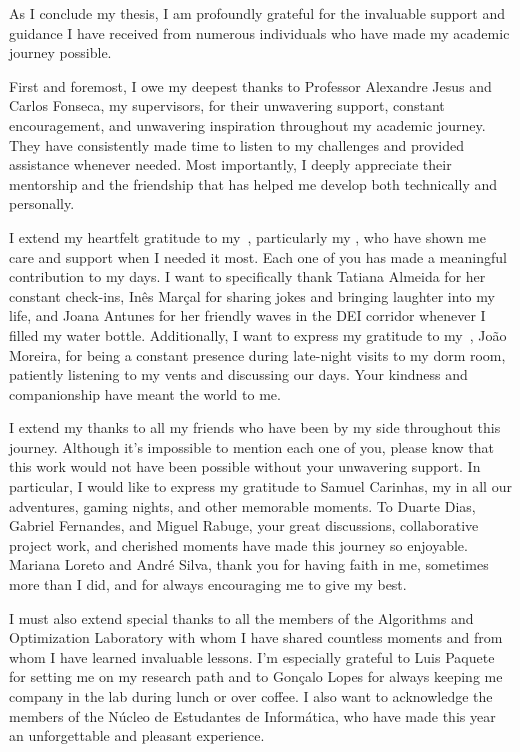 \begin{acknowledgments}

  As I conclude my thesis, I am profoundly grateful for the invaluable support and
  guidance I have received from numerous individuals who have made my academic
  journey possible.

  First and foremost, I owe my deepest thanks to Professor Alexandre Jesus and
  Carlos Fonseca, my supervisors, for their unwavering support, constant
  encouragement, and unwavering inspiration throughout my academic journey. They
  have consistently made time to listen to my challenges and provided assistance
  whenever needed. Most importantly, I deeply appreciate their mentorship and the
  friendship that has helped me develop both technically and personally.

  I extend my heartfelt gratitude to my~, particularly my
  , who have shown me care and support when I needed it most. Each
  one of you has made a meaningful contribution to my days. I want to specifically
  thank Tatiana Almeida for her constant check-ins, Inês Marçal for sharing jokes
  and bringing laughter into my life, and Joana Antunes for her friendly waves in
  the DEI corridor whenever I filled my water bottle. Additionally, I want to
  express my gratitude to my~, João Moreira, for being a constant presence
  during late-night visits to my dorm room, patiently listening to my vents and
  discussing our days. Your kindness and companionship have meant the world to me.

  I extend my thanks to all my friends who have been by my side throughout this
  journey. Although it's impossible to mention each one of you, please know that
  this work would not have been possible without your unwavering support. In
  particular, I would like to express my gratitude to Samuel Carinhas, my
   in all our adventures, gaming nights, and other memorable moments. To Duarte
  Dias, Gabriel Fernandes, and Miguel Rabuge, your great discussions,
  collaborative project work, and cherished moments have made this journey so
  enjoyable. Mariana Loreto and André Silva, thank you for having faith in me,
  sometimes more than I did, and for always encouraging me to give my best.

  I must also extend special thanks to all the members of the Algorithms and
  Optimization Laboratory with whom I have shared countless moments and from whom
  I have learned invaluable lessons. I'm especially grateful to Luis Paquete for
  setting me on my research path and to Gonçalo Lopes for always keeping me
  company in the lab during lunch or over coffee. I also want to acknowledge the
  members of the Núcleo de Estudantes de Informática, who have made this year an
  unforgettable and pleasant experience.


\end{acknowledgments}
